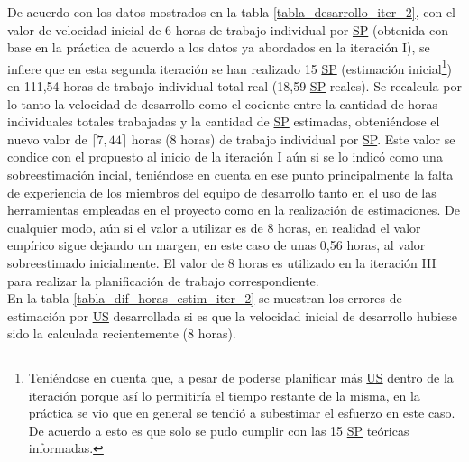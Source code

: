 \documentclass[a4paper, 12pt,twoside]{report}  %
\numberwithin{equation}{subsection} %
\begin{document}
De acuerdo con los datos mostrados en la tabla \ref{tabla_desarrollo_iter_2}, con el valor de velocidad inicial de 6 horas de trabajo individual por \hyperlink{SP}{SP} (obtenida con base en la práctica de acuerdo a los datos ya abordados en la iteración I), se infiere que en esta segunda iteración se han realizado 15 \hyperlink{SP}{SP} (estimación inicial\renewcommand*{\thefootnote}{\fnsymbol{footnote}}\footnote[1]{Teniéndose en cuenta que, a pesar de poderse planificar más \hyperlink{US}{US} dentro de la iteración porque así lo permitiría el tiempo restante de la misma, en la práctica se vio que en general se tendió a subestimar el esfuerzo en este caso. De acuerdo a esto es que solo se pudo cumplir con las 15 \hyperlink{SP}{SP} teóricas informadas.}\renewcommand*{\thefootnote}{\arabic{footnote}}) en 111,54 horas de trabajo individual total real (18,59 \hyperlink{SP}{SP} reales). Se recalcula por lo tanto la velocidad de desarrollo como el cociente entre la cantidad de horas individuales totales trabajadas y la cantidad de \hyperlink{SP}{SP} estimadas, obteniéndose el nuevo valor de \begin{math}\lceil 7,44\rceil\end{math} horas (8 horas) de trabajo individual por \hyperlink{SP}{SP}. Este valor se condice con el propuesto al inicio de la iteración I aún si se lo indicó como una sobreestimación incial, teniéndose en cuenta en ese punto principalmente la falta de experiencia de los miembros del equipo de desarrollo tanto en el uso de las herramientas empleadas en el proyecto como en la realización de estimaciones. De cualquier modo, aún si el valor a utilizar es de 8 horas, en realidad el valor empírico sigue dejando un margen, en este caso de unas 0,56 horas, al valor sobreestimado inicialmente. El valor de 8 horas es utilizado en la iteración III para realizar la planificación de trabajo correspondiente.\\
\indent En la tabla \ref{tabla_dif_horas_estim_iter_2} se muestran los errores de estimación por \hyperlink{US}{US} desarrollada si es que la velocidad inicial de desarrollo hubiese sido la calculada recientemente (8 horas).
\end{document}
